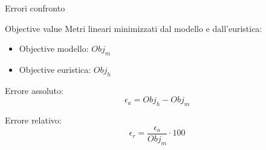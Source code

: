 \documentclass{beamer}
\begin{document}
\begin{frame}{Errori confronto}
	\begin{block}{Objective value}
		Metri lineari minimizzati dal modello e dall'euristica:
		\begin{itemize}
			\item Objective modello: $Obj_m$
			\item Objective euristica: $Obj_h$
		\end{itemize}
	\end{block}
	\begin{minipage}[c]{0.45\textwidth}
		\begin{alertblock}{Errore assoluto:}
			$$\epsilon_a = Obj_h - Obj_m$$
		\end{alertblock}
	\end{minipage}
	\hfill
	\begin{minipage}[c]{0.45\textwidth}
		\begin{alertblock}{Errore relativo:}
			$$\epsilon_r = \frac{\epsilon_a}{Obj_m} \cdot 100$$
		\end{alertblock}	
	\end{minipage}
					
\end{frame}
					
\end{document}
